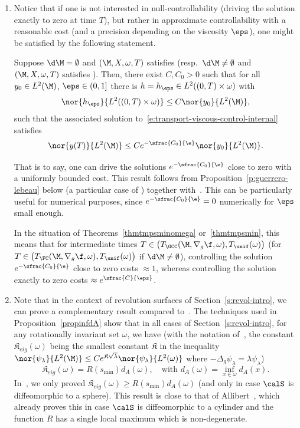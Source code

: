 \begin{enumerate}
\item Notice that if one is not interested in null-controllability (\ie driving the solution exactly to zero at time $T$), but rather in approximate controllability with a reasonable cost (and a precision depending on the viscosity $\eps$), one might be satisfied by the following statement.
\begin{proposition}
\label{p:guerrero-lebeau-control}
Suppose $\d\M= \emptyset$ and $(\M, X,\omega,T)$ satisfies \pGCC (resp.\ $\d\M \neq \emptyset$ and $(\M, X,\omega,T)$ satisfies \pFC). Then, there exist $C,C_0>0$ such that for all $y_0\in L^2(\M)$, $\eps \in (0,1]$ there is $h=h_\eps \in L^2((0,T)\times \omega)$ with
\[
\nor{h_\eps}{L^2((0,T)\times \omega)} \leq C \nor{y_0}{L^2(\M)},
\]
such that the associated solution to~\eqref{e:transport-viscous-control-internal} satisfies
\[
\nor{y(T)}{L^2(\M)} \leq Ce^{-\sfrac{C_{0}}{\e}} \nor{y_0}{L^2(\M)}.
\]
\end{proposition}
That is to say, one can drive the solutions $e^{-\sfrac{C_{0}}{\e}} $ close to zero with a uniformly bounded cost.
This result follows from Proposition~\ref{p:guerrero-lebeau} below (a particular case of \cite[Prop.\,3]{GL:07}) together with~\cite[App.]{LL:17approx}.
This can be particularly useful for numerical purposes, since $e^{-\sfrac{C_{0}}{\e}} = 0$ numerically for $\eps$ small enough.

In the situation of Theorems~\ref{thmtmpsminomega} or~\ref{thmtmpsmin}, this means that for intermediate times $T \in\nobreak \big(T_{\GCC}(\M, \nabla_g\f,\omega), T_{\unif}(\omega) \big)$ (\resp for $T \in \big(T_{\FC}(\M, \nabla_g\f,\omega), T_{\unif}(\omega) \big)$ if $\d\M \neq\nobreak \emptyset$), controlling the solution $e^{-\sfrac{C_{0}}{\e}}$ close to zero costs $\approx 1$, whereas controlling the solution exactly to zero costs $\approx e^{\sfrac{C}{\eps}}$.

\item Note that in the context of revolution surfaces of Section~\ref{s:revol-intro}, we can prove a complementary result compared to~\cite[Th.\,1.9/Cor.\,1.10]{LL:18}. The techniques used in Proposition~\ref{propinfdA} show that in all cases of Section~\ref{s:revol-intro}, for any rotationally invariant set $\omega$, we have (with the notation of~\cite{LL:18}, the constant $\mathfrak{K}_{eig}(\omega)$ being the smallest constant $\mathfrak{K}$ in the inequality $\nor{\psi_\lambda}{L^2(\M)} \leq Ce^{\mathfrak{K}\sqrt{\lambda}}\nor{\psi_\lambda}{L^2(\omega)}$ where $-\Delta_g \psi_\lambda = \lambda \psi_\lambda$)
\[
\mathfrak{K}_{eig}(\omega) = R(s_{\min}) d_A(\omega), \quad \text{with } d_A(\omega) = \inf_{x\in \omega} d_A(x).
\]
In~\cite{LL:18}, we only proved $\mathfrak{K}_{eig}(\omega) \geq R(s_{\min}) d_A(\omega)$ (and only in case $\calS$ is diffeomorphic to a sphere). This result is close to that of Allibert~\cite{Allibert:98}, which already proves this in case $\calS$ is diffeomorphic to a cylinder and the function $R$ has a single local maximum which is non-degenerate.
\end{enumerate}

